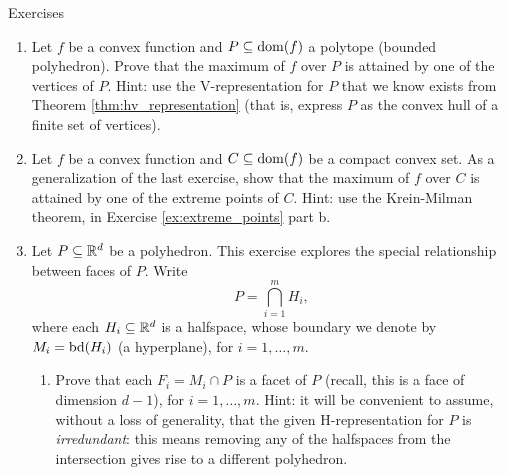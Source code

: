 \begin{xcb}{Exercises}
\begin{enumerate}[label=\thechapter.\arabic*]
\begin{enumerate}[label=\alph*.]
\item Prove that $\mathrm{exp}(C) \subseteq \mathrm{ext}(C)$. 

\item Prove that this is not an equality in general, by giving an example such 
  that $\mathrm{exp}(C) \subsetneq \mathrm{ext}(C)$ (an example with extreme
  points that are not exposed).     
\end{enumerate}

\smallskip
A note on Straszewicz's theorem, from Chapter \ref{sec:polyhedra}: we can
interpret this result, in light of parts b, c, d, as saying that for any compact
convex set $C$, the set of exposed points $\mathrm{exp}(C)$ is dense in the set
of extreme points $\mathrm{ext}(C)$. For polytopes, these two sets are finite,
and thus must be equal, which gives us another way of understanding Theorem  
\ref{thm:hv_representation}.  

\item Let $f$ be a convex function and $P \subseteq \operatorname{dom}(f)$ a polytope
  (bounded polyhedron). Prove that the maximum of $f$ over $P$ is attained by
  one of the vertices of $P$. Hint: use the V-representation for $P$ that we
  know exists from Theorem \ref{thm:hv_representation} (that is, express $P$ as 
  the convex hull of a finite set of vertices). 

\item \label{ex:convex_maximization}
  Let $f$ be a convex function and $C \subseteq \operatorname{dom}(f)$ be a compact convex
  set. As a generalization of the last exercise, show that the maximum of $f$
  over $C$ is attained by one of the extreme points of $C$. Hint: use the
  Krein-Milman theorem, in Exercise \ref{ex:extreme_points} part b. 

\item \label{ex:face_structure} 
  Let $P \subseteq \mathbb{R}^d$ be a polyhedron. This exercise explores the special
  relationship between faces of $P$. Write
  \[
  P = \bigcap_{i=1}^m H_i,
  \]
  where each $H_i \subseteq \mathbb{R}^d$ is a halfspace, whose boundary we denote by 
  $M_i = \operatorname{bd}(H_i)$ (a hyperplane), for $i=1,\dots,m$. 

\begin{enumerate}[label=\alph*.]
\item Prove that each $F_i = M_i \cap P$ is a facet of $P$ (recall, this is a
  face of dimension $d-1$), for $i=1,\dots,m$. Hint: it will be convenient to
  assume, without a loss of generality, that the given H-representation for $P$
  is \emph{irredundant}: this means removing any of the halfspaces from the
  intersection gives rise to a different polyhedron.  


\end{enumerate}
\end{enumerate}
\end{xcb}
